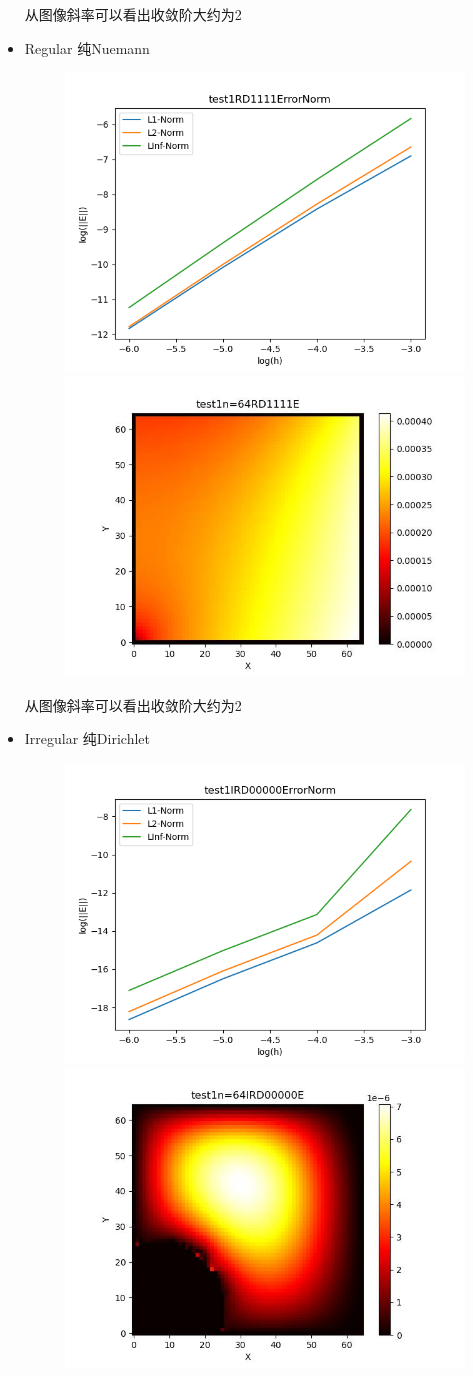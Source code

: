 \documentclass{article}
\begin{document}
\begin{itemize}
    从图像斜率可以看出收敛阶大约为2
    \item Regular 纯Nuemann
    \begin{figure}[h]
        \centering
        \includegraphics[width=0.35\linewidth]{test1RD1111ErrorNormjpg.png}
        \includegraphics[width=0.35\linewidth]{test1n=64RD1111E.jpg}
    \end{figure}

    从图像斜率可以看出收敛阶大约为2
    \newpage
    \item Irregular 纯Dirichlet
    \begin{figure}[h]
        \centering
        \includegraphics[width=0.35\linewidth]{test1IRD00000ErrorNormjpg.png}
        \includegraphics[width=0.35\linewidth]{test1n=64IRD00000E.jpg}
    \end{figure}


\end{itemize}
\end{document}
